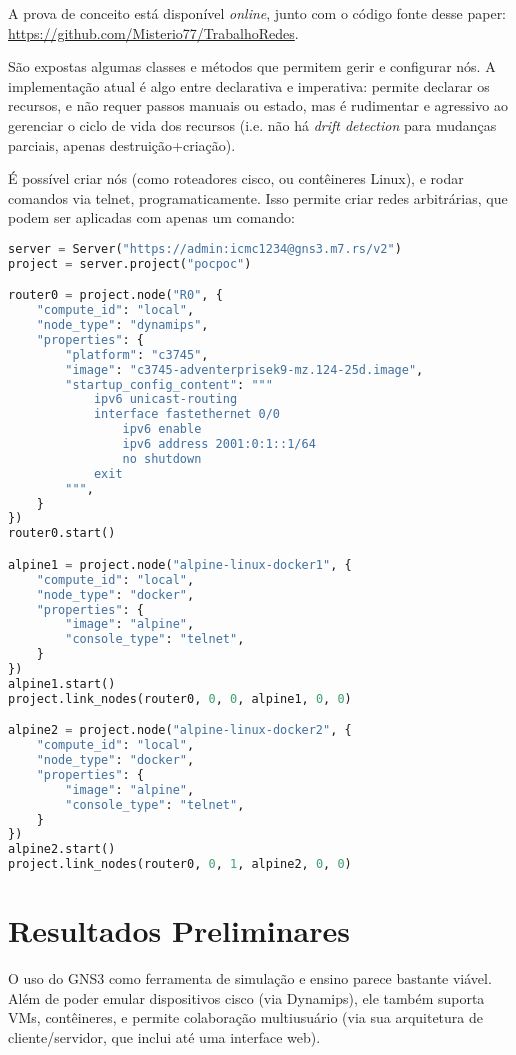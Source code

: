 \documentclass[12pt]{article}
\begin{document}
A prova de conceito está disponível \textit{online}, junto com o código fonte desse paper: \url{https://github.com/Misterio77/TrabalhoRedes}.

São expostas algumas classes e métodos que permitem gerir e configurar nós. A
implementação atual é algo entre declarativa e imperativa: permite declarar os
recursos, e não requer passos manuais ou estado, mas é rudimentar e agressivo
ao gerenciar o ciclo de vida dos recursos (i.e. não há \textit{drift detection}
para mudanças parciais, apenas destruição+criação).

É possível criar nós (como roteadores cisco, ou contêineres Linux), e rodar
comandos via telnet, programaticamente. Isso permite criar redes arbitrárias,
que podem ser aplicadas com apenas um comando:

\begin{lstlisting}[language=Python]
server = Server("https://admin:icmc1234@gns3.m7.rs/v2")
project = server.project("pocpoc")

router0 = project.node("R0", {
    "compute_id": "local",
    "node_type": "dynamips",
    "properties": {
        "platform": "c3745",
        "image": "c3745-adventerprisek9-mz.124-25d.image",
        "startup_config_content": """
            ipv6 unicast-routing
            interface fastethernet 0/0
                ipv6 enable
                ipv6 address 2001:0:1::1/64
                no shutdown
            exit
        """,
    }
})
router0.start()

alpine1 = project.node("alpine-linux-docker1", {
    "compute_id": "local",
    "node_type": "docker",
    "properties": {
        "image": "alpine",
        "console_type": "telnet",
    }
})
alpine1.start()
project.link_nodes(router0, 0, 0, alpine1, 0, 0)

alpine2 = project.node("alpine-linux-docker2", {
    "compute_id": "local",
    "node_type": "docker",
    "properties": {
        "image": "alpine",
        "console_type": "telnet",
    }
})
alpine2.start()
project.link_nodes(router0, 0, 1, alpine2, 0, 0)
\end{lstlisting}

\section{Resultados Preliminares}

O uso do GNS3 como ferramenta de simulação e ensino parece bastante viável.
Além de poder emular dispositivos cisco (via Dynamips), ele também suporta VMs,
contêineres, e permite colaboração multiusuário (via sua arquitetura de
cliente/servidor, que inclui até uma interface web).
\end{document}
